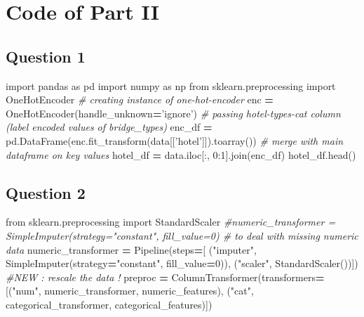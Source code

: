 \documentclass[10pt,a4paper]{article}
\newenvironment{Shaded}{\begin{snugshade}}{\end{snugshade}}
\newcommand{\CommentTok}[1]{\textcolor[rgb]{0.56,0.35,0.01}{\textit{#1}}}
\newcommand{\DecValTok}[1]{\textcolor[rgb]{0.00,0.00,0.81}{#1}}
\newcommand{\ImportTok}[1]{#1}
\newcommand{\NormalTok}[1]{#1}
\newcommand{\OperatorTok}[1]{\textcolor[rgb]{0.81,0.36,0.00}{\textbf{#1}}}
\newcommand{\StringTok}[1]{\textcolor[rgb]{0.31,0.60,0.02}{#1}}
\theoremstyle{break}
\begin{document}
\newpage

\hypertarget{annexe:annexe2}{%
\section{Code of Part II}\label{annexe:annexe2}}

\hypertarget{question-1}{%
\subsection{Question 1}\label{question-1}}

\begin{Shaded}
\begin{Highlighting}[]
\ImportTok{import}\NormalTok{ pandas }\ImportTok{as}\NormalTok{ pd}
\ImportTok{import}\NormalTok{ numpy }\ImportTok{as}\NormalTok{ np}
\ImportTok{from}\NormalTok{ sklearn.preprocessing }\ImportTok{import}\NormalTok{ OneHotEncoder }
\CommentTok{# creating instance of one-hot-encoder}
\NormalTok{enc }\OperatorTok{=}\NormalTok{ OneHotEncoder(handle_unknown}\OperatorTok{=}\StringTok{'ignore'}\NormalTok{)}
\CommentTok{# passing hotel-types-cat column (label encoded values of bridge_types)}
\NormalTok{enc_df }\OperatorTok{=}\NormalTok{ pd.DataFrame(enc.fit_transform(data[[}\StringTok{'hotel'}\NormalTok{]]).toarray())}
\CommentTok{# merge with main dataframe on key values}
\NormalTok{hotel_df }\OperatorTok{=}\NormalTok{ data.iloc[:, }\DecValTok{0}\NormalTok{:}\DecValTok{1}\NormalTok{].join(enc_df)}
\NormalTok{hotel_df.head()}
\end{Highlighting}
\end{Shaded}

\hypertarget{question-2}{%
\subsection{Question 2}\label{question-2}}

\begin{Shaded}
\begin{Highlighting}[]
\ImportTok{from}\NormalTok{ sklearn.preprocessing }\ImportTok{import}\NormalTok{ StandardScaler}
\CommentTok{#numeric_transformer = SimpleImputer(strategy="constant", fill_value=0) # to deal with missing numeric data}
\NormalTok{numeric_transformer }\OperatorTok{=}\NormalTok{ Pipeline(steps}\OperatorTok{=}\NormalTok{[}
\NormalTok{                                    (}\StringTok{"imputer"}\NormalTok{, SimpleImputer(strategy}\OperatorTok{=}\StringTok{"constant"}\NormalTok{, fill_value}\OperatorTok{=}\DecValTok{0}\NormalTok{)),}
\NormalTok{                                    (}\StringTok{"scaler"}\NormalTok{, StandardScaler())]) }\CommentTok{#NEW : rescale the data !}
\NormalTok{preproc }\OperatorTok{=}\NormalTok{ ColumnTransformer(transformers}\OperatorTok{=}\NormalTok{[(}\StringTok{"num"}\NormalTok{, numeric_transformer, numeric_features),}
\NormalTok{                                          (}\StringTok{"cat"}\NormalTok{, categorical_transformer, categorical_features)])}
\end{Highlighting}
\end{Shaded}
\end{document}
